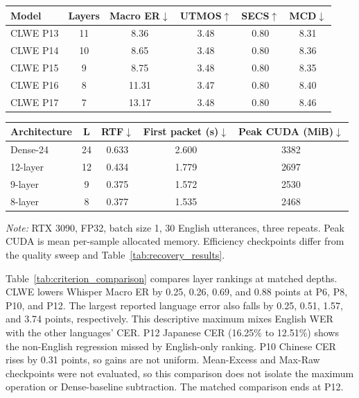 \documentclass{article}
\begin{document}
\par\smallskip
\noindent\begin{minipage}{\columnwidth}
\centering
{}
\label{tab:high_compression}
\small
\setlength{\tabcolsep}{2.5pt}
\renewcommand{\arraystretch}{1.05}
\begin{tabular}{lccccc}
\toprule
\textbf{Model} & \textbf{Layers} & \textbf{Macro ER$\downarrow$} &
\textbf{UTMOS$\uparrow$} & \textbf{SECS$\uparrow$} &
\textbf{MCD$\downarrow$} \\
\midrule
CLWE P13 & 11 & 8.36 & 3.48 & 0.80 & 8.31 \\
CLWE P14 & 10 & 8.65 & 3.48 & 0.80 & 8.36 \\
CLWE P15 & 9  & 8.75 & 3.48 & 0.80 & 8.35 \\
CLWE P16 & 8  & 11.31 & 3.47 & 0.80 & 8.40 \\
CLWE P17 & 7  & 13.17 & 3.48 & 0.80 & 8.46 \\
\bottomrule
\end{tabular}%
\vspace{0.6mm}

\begin{tabular}{lcccc}
\toprule
\textbf{Architecture} & \textbf{L} & \textbf{RTF$\downarrow$} &
\textbf{First packet (s)$\downarrow$} & \textbf{Peak CUDA (MiB)$\downarrow$} \\
\midrule
Dense-24 & 24 & 0.633 & 2.600 & 3382 \\
12-layer & 12 & 0.434 & 1.779 & 2697 \\
9-layer & 9 & 0.375 & 1.572 & 2530 \\
8-layer & 8 & 0.377 & 1.535 & 2468 \\
\bottomrule
\end{tabular}%
\vspace{0.4mm}
\parbox{\columnwidth}{\small\textit{Note:}
RTX 3090, FP32, batch size 1, 30 English utterances, three repeats.
Peak CUDA is mean per-sample allocated memory. Efficiency checkpoints
differ from the quality sweep and Table~\ref{tab:recovery_results}.}
\end{minipage}\par\smallskip
\setcounter{table}{3} %


Table~\ref{tab:criterion_comparison} compares layer rankings at
matched depths. CLWE lowers Whisper Macro ER by 0.25, 0.26, 0.69, and
0.88 points at P6, P8, P10, and P12. The largest reported language
error also falls by 0.25, 0.51, 1.57, and 3.74 points, respectively.
This descriptive maximum mixes English WER with the other languages'
CER. P12 Japanese CER (16.25\% to 12.51\%) shows the non-English
regression missed by English-only ranking. P10 Chinese CER rises by
0.31 points, so gains are not uniform. Mean-Excess and Max-Raw
checkpoints were not evaluated, so this comparison does not isolate
the maximum operation or Dense-baseline subtraction. The matched
comparison ends at P12.
\end{document}
